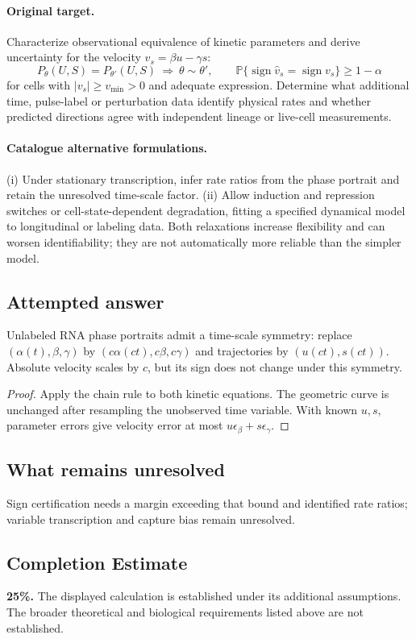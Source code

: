 \documentclass[11pt]{article}
\begin{document}
\paragraph{Original target.}
Characterize observational equivalence of kinetic parameters and derive uncertainty for the velocity $v_s=\beta u-\gamma s$:
\[P_\theta(U,S)=P_{\theta'}(U,S)\ \Longrightarrow\ \theta\sim\theta',\qquad \mathbb{P}\{\operatorname{sign}\widehat v_s=\operatorname{sign}v_s\}\ge1-\alpha\]
for cells with $|v_s|\ge v_{\min}>0$ and adequate expression. Determine what additional time, pulse-label or perturbation data identify physical rates and whether predicted directions agree with independent lineage or live-cell measurements.
\paragraph{Catalogue alternative formulations.}
(i) Under stationary transcription, infer rate ratios from the phase portrait and retain the unresolved time-scale factor. (ii) Allow induction and repression switches or cell-state-dependent degradation, fitting a specified dynamical model to longitudinal or labeling data. Both relaxations increase flexibility and can worsen identifiability; they are not automatically more reliable than the simpler model.
\subsection{Attempted answer}
\begin{proposition}
Unlabeled RNA phase portraits admit a time-scale symmetry: replace $(\alpha(t),\beta,\gamma)$ by $(c\alpha(ct),c\beta,c\gamma)$ and trajectories by $(u(ct),s(ct))$. Absolute velocity scales by $c$, but its sign does not change under this symmetry.
\end{proposition}
\begin{proof}
Apply the chain rule to both kinetic equations. The geometric curve is unchanged after resampling the unobserved time variable. With known $u,s$, parameter errors give velocity error at most $u\epsilon_\beta+s\epsilon_\gamma$.
\end{proof}
\subsection{What remains unresolved}
Sign certification needs a margin exceeding that bound and identified rate ratios; variable transcription and capture bias remain unresolved.
\subsection{Completion Estimate}
\textbf{25\%.} The displayed calculation is established under its additional assumptions. The broader theoretical and biological requirements listed above are not established.
\end{document}
